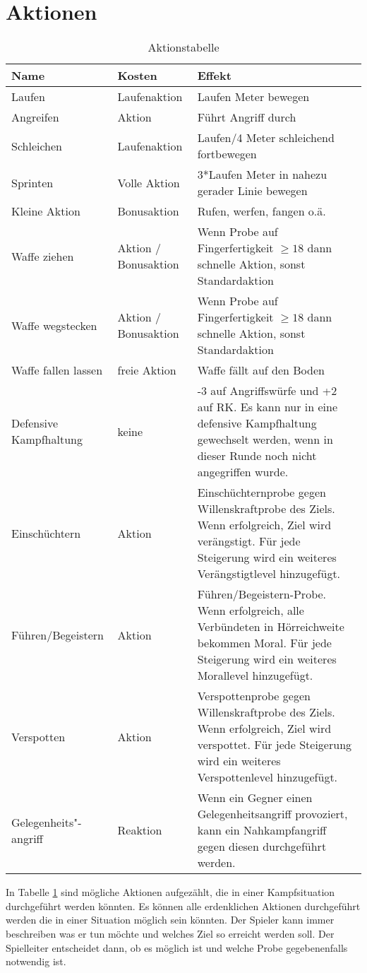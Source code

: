 \documentclass[../../Heldenanleitung2]{subfiles}
\begin{document}
\section{Aktionen}
\renewcommand{\arraystretch}{1.5}
{
\begin{table}
\caption{Aktionstabelle}
\label{tab:Aktionen}
\begin{tabular}{|p{}|p{}|p{}|}
\hline
Name & Kosten & Effekt\\
\hline
Laufen & Laufenaktion & Laufen Meter bewegen \\
Angreifen & Aktion & Führt Angriff durch \\
Schleichen & Laufenaktion & Laufen/4 Meter schleichend fortbewegen\\
Sprinten & Volle Aktion & 3*Laufen Meter in nahezu gerader Linie bewegen\\
Kleine Aktion & Bonusaktion & Rufen, werfen, fangen o.ä.\\
Waffe ziehen & Aktion / Bonusaktion & Wenn Probe auf Fingerfertigkeit $\geq 18$ dann schnelle Aktion, sonst Standardaktion\\
Waffe wegstecken & Aktion / Bonusaktion & Wenn Probe auf Fingerfertigkeit $\geq 18$ dann schnelle Aktion, sonst Standardaktion\\
Waffe fallen lassen & freie Aktion & Waffe fällt auf den Boden\\
Defensive Kampfhaltung & keine & -3 auf Angriffswürfe und +2 auf RK. Es kann nur in eine defensive Kampfhaltung gewechselt werden, wenn in dieser Runde noch nicht angegriffen wurde.\\
Einschüchtern & Aktion & Einschüchternprobe gegen Willenskraftprobe des Ziels. Wenn erfolgreich, Ziel wird verängstigt. Für jede Steigerung wird ein weiteres Verängstigtlevel hinzugefügt.\\
Führen/Begeistern & Aktion & Führen/Begeistern-Probe. Wenn erfolgreich, alle Verbündeten in Hörreichweite bekommen Moral. Für jede Steigerung wird ein weiteres Morallevel hinzugefügt.\\
Verspotten & Aktion & Verspottenprobe gegen Willenskraftprobe des Ziels. Wenn erfolgreich, Ziel wird verspottet. Für jede Steigerung wird ein weiteres Verspottenlevel hinzugefügt.\\
Gelegenheits"-angriff & Reaktion & Wenn ein Gegner einen Gelegenheitsangriff provoziert, kann ein Nahkampfangriff gegen diesen durchgeführt werden.\\
\hline
\end{tabular}
\end{table}
}
In Tabelle \ref{tab:Aktionen} sind mögliche Aktionen aufgezählt, die in einer Kampfsituation durchgeführt werden könnten. Es können alle erdenklichen Aktionen durchgeführt werden die in einer Situation möglich sein könnten. Der Spieler kann immer beschreiben was er tun möchte und welches Ziel so erreicht werden soll. Der Spielleiter entscheidet dann, ob es möglich ist und welche Probe gegebenenfalls notwendig ist.
\end{document}
